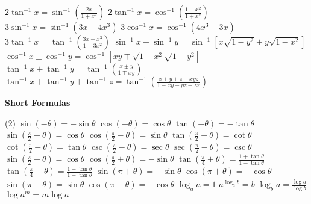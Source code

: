 \documentclass[10pt,a4paper,landscape]{article}
\begin{document}
\begin{multicols*}{3}
\begin{tasks}
			\task $2\tan^{-1} x = \sin^{-1}\left(\frac{2x}{1+x^2}\right)$
			\task $2\tan^{-1} x = \cos^{-1}\left(\frac{1-x^2}{1+x^2}\right)$
			\task $3\sin^{-1} x = \sin^{-1}(3x - 4x^3)$
			\task $3\cos^{-1} x = \cos^{-1}(4x^3 - 3x)$
			\task $3\tan^{-1} x = \tan^{-1}\left(\frac{3x-x^3}{1-3x^2}\right)$
			\task $\sin^{-1} x \pm \sin^{-1} y = \sin^{-1}\left[x\sqrt{1-y^2} \pm y\sqrt{1-x^2}\right]$
			\task $\cos^{-1} x \pm \cos^{-1} y = \cos^{-1}\left[xy \mp \sqrt{1-x^2}\sqrt{1-y^2}\right]$
			\task $\tan^{-1} x \pm \tan^{-1} y = \tan^{-1}\left(\frac{x \pm y}{1 \mp xy}\right)$
			\task $\tan^{-1} x + \tan^{-1} y + \tan^{-1} z = \tan^{-1}\left(\frac{x+y+z-xyz}{1-xy-yz-zx}\right)$
		\end{tasks}
		
		\noindent \textbf{Short Formulas}
		\vspace{-.15 cm}
		\begin{tasks}(2)
			\task $\sin(-\theta) = -\sin\theta$
			\task $\cos(-\theta) = \cos\theta$
			\task $\tan(-\theta) = -\tan\theta$
			\task $\sin\left(\frac{\pi}{2} - \theta\right) = \cos\theta$
			\task $\cos\left(\frac{\pi}{2} - \theta\right) = \sin\theta$
			\task $\tan\left(\frac{\pi}{2} - \theta\right) = \cot\theta$
			\task $\cot\left(\frac{\pi}{2} - \theta\right) = \tan\theta$
			\task $\csc\left(\frac{\pi}{2} - \theta\right) = \sec\theta$
			\task $\sec\left(\frac{\pi}{2} - \theta\right) = \csc\theta$
			\task $\sin\left(\frac{\pi}{2} + \theta\right) = \cos\theta$
			\task $\cos\left(\frac{\pi}{2} + \theta\right) = -\sin\theta$
			\task $\tan\left(\frac{\pi}{4} + \theta\right) = \frac{1+\tan\theta}{1-\tan\theta}$
			\task $\tan\left(\frac{\pi}{4} - \theta\right) = \frac{1-\tan\theta}{1+\tan\theta}$
			\task $\sin(\pi + \theta) = -\sin\theta$
			\task $\cos(\pi + \theta) = -\cos\theta$
			\task $\sin(\pi - \theta) = \sin\theta$
			\task $\cos(\pi - \theta) = -\cos\theta$
			\task $\log_a a = 1$
			\task $a^{\log_a b} = b$
			\task $\log_b a = \frac{\log a}{\log b}$
			\task $\log a^m = m \log a$
		\end{tasks}
		
		
	\end{multicols*}
	
\end{document}
